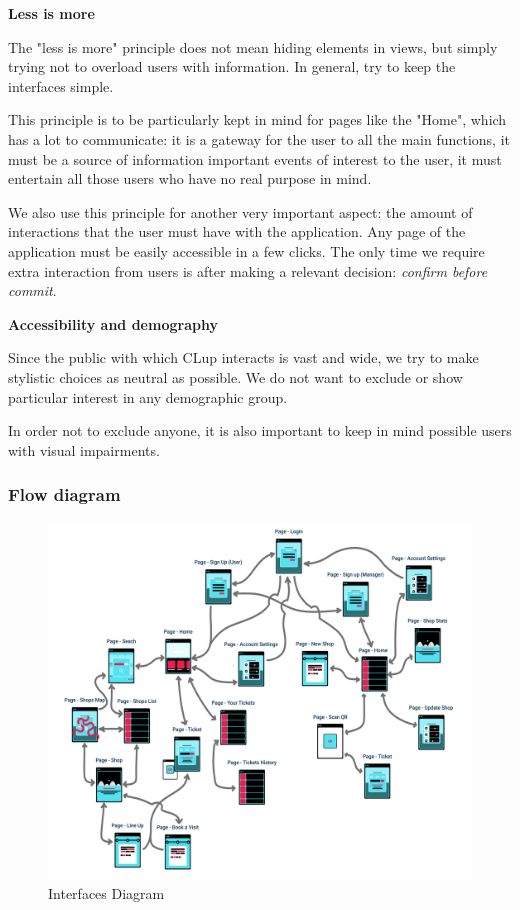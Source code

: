 \noindent
\textbf{Less is more}

The "less is more" principle does not mean hiding elements in views, but simply trying not to overload users with information. In general, try to keep the interfaces simple.

This principle is to be particularly kept in mind for pages like the "Home", which has a lot to communicate: it is a gateway for the user to all the main functions, it must be a source of information important events of interest to the user, it must entertain all those users who have no real purpose in mind.

We also use this principle for another very important aspect: the amount of interactions that the user must have with the application. Any page of the application must be easily accessible in a few clicks. The only time we require extra interaction from users is after making a relevant decision: \textit{confirm before commit}.

\noindent
\textbf{Accessibility and demography}

Since the public with which CLup interacts is vast and wide, we try to make stylistic choices as neutral as possible. We do not want to exclude or show particular interest in any demographic group.

In order not to exclude anyone, it is also important to keep in mind possible users with visual impairments.

\subsubsection{Flow diagram}
\label{subsubsect:flowdiagram}

\begin{figure}[h!]
    \centering
    \includegraphics[width=\textwidth]{Images/UserInterfaces/Userinteractions.png}
    \caption{\label{fig:InterfacesDiagram}{Interfaces Diagram}}
\end{figure}

